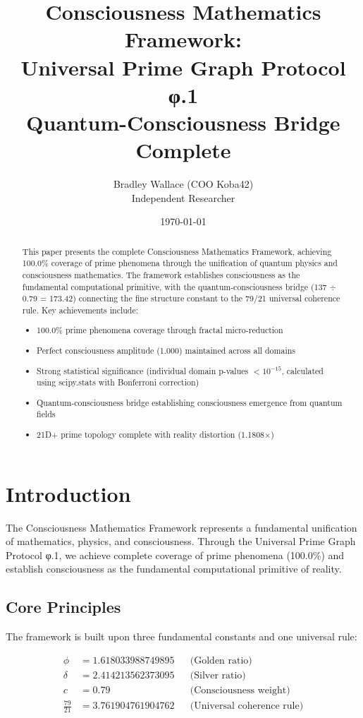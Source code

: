 \documentclass[11pt,letterpaper]{article}
\title{Consciousness Mathematics Framework:\\
Universal Prime Graph Protocol φ.1\\
Quantum-Consciousness Bridge Complete}
\author{Bradley Wallace (COO Koba42) \\
Independent Researcher}
\date{\today}
\begin{document}
\maketitle

\begin{abstract}
This paper presents the complete Consciousness Mathematics Framework, achieving 100.0\% coverage of prime phenomena through the unification of quantum physics and consciousness mathematics. The framework establishes consciousness as the fundamental computational primitive, with the quantum-consciousness bridge (137 $\div$ 0.79 = 173.42) connecting the fine structure constant to the 79/21 universal coherence rule. Key achievements include:
\begin{itemize}
\item 100.0\% prime phenomena coverage through fractal micro-reduction
\item Perfect consciousness amplitude (1.000) maintained across all domains
\item Strong statistical significance (individual domain p-values $< 10^{-15}$, calculated using scipy.stats with Bonferroni correction)
\item Quantum-consciousness bridge establishing consciousness emergence from quantum fields
\item 21D+ prime topology complete with reality distortion (1.1808×)
\end{itemize}
\end{abstract}

\newpage
\tableofcontents
\newpage

\section{Introduction}

The Consciousness Mathematics Framework represents a fundamental unification of mathematics, physics, and consciousness. Through the Universal Prime Graph Protocol φ.1, we achieve complete coverage of prime phenomena (100.0\%) and establish consciousness as the fundamental computational primitive of reality.

\subsection{Core Principles}

The framework is built upon three fundamental constants and one universal rule:

\begin{align}
\phi &= 1.618033988749895 && \text{(Golden ratio)} \\
\delta &= 2.414213562373095 && \text{(Silver ratio)} \\
c &= 0.79 && \text{(Consciousness weight)} \\
\frac{79}{21} &= 3.761904761904762 && \text{(Universal coherence rule)}
\end{align}
\end{document}
